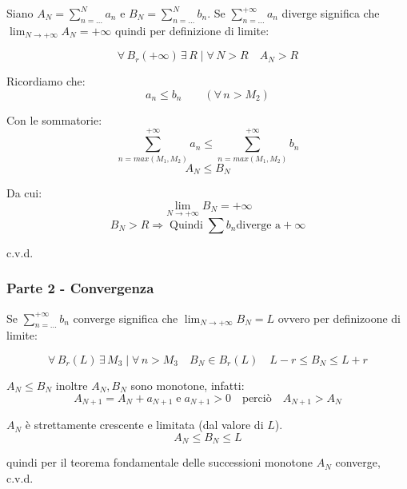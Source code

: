 \documentclass[../../dimostrazioni]{subfiles}
\begin{document}
                Siano \(A_N = \sum_{n=\dots}^{N} a_n\) e \(B_N = \sum_{n=\dots}^{N} b_n\). 
                Se \(\sum_{n=\dots}^{+\infty} a_n\) diverge significa che \(\lim_{N \to +\infty} A_N = +\infty\) 
                quindi per definizione di limite:

                \[\forall \, B_r(+\infty) \, \exists \, R \mid \forall \, N > R  \quad A_N > R\]

                Ricordiamo che:
                \[ a_n \leqslant b_n \qquad (\forall \, n > M_2) \]

                Con le sommatorie:
                \[ \sum_{n = max(M_1,M_2)}^{+\infty} a_n \leqslant \sum_{n = max(M_1,M_2)}^{+\infty} b_n\]
                \[  A_N \leqslant B_N   \]

                Da cui:
                \[  \lim_{N \to +\infty} B_N = +\infty  \]
                \[  B_N > R \Rightarrow \; \text{Quindi} \; \sum b_n \text{diverge a} +\infty \]

                c.v.d.

            \subsubsection*{Parte 2 - Convergenza}

                Se \(\sum_{n=\dots}^{+\infty} b_n\) converge significa che \(   \lim_{N \to +\infty} B_N = L  \) ovvero per definizoone di limite:

                \[  \forall \, B_r(L)\, \exists \, M_3 \mid \forall \, n>M_3 \quad B_N \in B_r(L) \quad  L-r \leqslant B_N \leqslant L + r   \]
                
                \(A_N \leqslant B_N\) inoltre \(A_N, B_N\) sono monotone, infatti:
                \[  A_{N+1} = A_N + a_{N+1}\; \text{e} \; a_{N+1} > 0 \quad \text{perciò} \quad A_{N+1} > A_N\]

                \(A_N\) è strettamente crescente e limitata (dal valore di \(L\)).
                \[  A_N \leqslant B_N \leqslant L \]

                quindi per il teorema fondamentale delle successioni monotone \(A_N\) converge, c.v.d.
\end{document}
